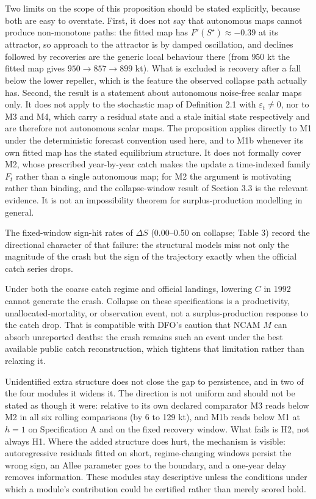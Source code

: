 \documentclass[11pt]{article}
\begin{document}
Two limits on the scope of this proposition should be stated
explicitly, because both are easy to overstate. First, it does not say
that autonomous maps cannot produce non-monotone paths: the fitted map
has \(F'(S^\star) \approx -0.39\) at its attractor, so approach to the
attractor is by damped oscillation, and declines followed by recoveries
are the generic local behaviour there (from \(950\) kt the fitted map
gives \(950 \to 857 \to 899\) kt). What is excluded is recovery after a
fall below the lower repeller, which is the feature the observed
collapse path actually has. Second, the result is a statement about
autonomous noise-free scalar maps only. It does not apply to the
stochastic map of Definition 2.1 with \(\varepsilon_t \neq 0\), nor to
M3 and M4, which carry a residual state and a stale initial state
respectively and are therefore not autonomous scalar maps. The
proposition applies directly to M1 under the deterministic forecast
convention used here, and to M1b whenever its own fitted map has the
stated equilibrium structure. It does not formally cover M2, whose
prescribed year-by-year catch makes the update a time-indexed family
\(F_t\) rather than a single autonomous map; for M2 the argument is
motivating rather than binding, and the collapse-window result of
Section 3.3 is the relevant evidence. It is not an impossibility
theorem for surplus-production modelling in general.

The fixed-window sign-hit rates of \(\Delta S\) (0.00--0.50 on collapse;
Table 3) record the directional character of that failure: the
structural models miss not only the magnitude of the crash but the sign
of the trajectory exactly when the official catch series drops.

Under both the coarse catch regime and official landings, lowering \(C\)
in 1992 cannot generate the crash. Collapse on these specifications is a
productivity, unallocated-mortality, or observation event, not a
surplus-production response to the catch drop. That is
compatible with DFO's caution that NCAM \(M\) can absorb unreported
deaths: the crash remains such an event under the best available public
catch reconstruction, which tightens that limitation rather than
relaxing it.

Unidentified extra structure does not close the gap to persistence, and
in two of the four modules it widens it. The direction is not uniform
and should not be stated as though it were: relative to its own declared
comparator M3 reads below M2 in all six rolling comparisons (by 6 to 129
kt), and M1b reads below M1 at \(h=1\) on Specification A and on the
fixed recovery window. What fails is H2, not always H1. Where the added
structure does hurt, the mechanism is visible: autoregressive residuals
fitted on short, regime-changing windows persist the wrong sign, an
Allee parameter goes to the boundary, and a one-year delay removes
information. These modules stay descriptive unless the conditions under
which a module's contribution could be certified rather than merely
scored hold.
\end{document}
